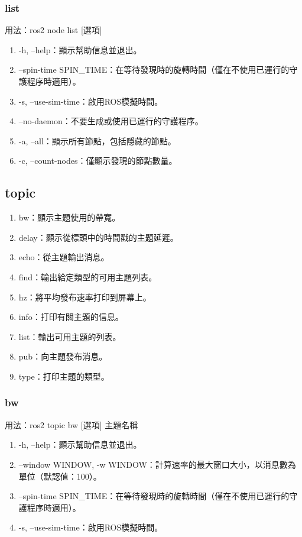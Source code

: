 \subsubsection{list}
用法：ros2 node list [選項]
\begin{enumerate}
    \item -h, --help：顯示幫助信息並退出。
    \item --spin-time SPIN\_TIME：在等待發現時的旋轉時間（僅在不使用已運行的守護程序時適用）。
    \item -s, --use-sim-time：啟用ROS模擬時間。
    \item --no-daemon：不要生成或使用已運行的守護程序。
    \item -a, --all：顯示所有節點，包括隱藏的節點。
    \item -c, --count-nodes：僅顯示發現的節點數量。
\end{enumerate}

\subsection{topic}
\begin{enumerate}
    \item bw：顯示主題使用的帶寬。
    \item delay：顯示從標頭中的時間戳的主題延遲。
    \item echo：從主題輸出消息。
    \item find：輸出給定類型的可用主題列表。
    \item hz：將平均發布速率打印到屏幕上。
    \item info：打印有關主題的信息。
    \item list：輸出可用主題的列表。
    \item pub：向主題發布消息。
    \item type：打印主題的類型。
\end{enumerate}
\subsubsection{bw}
用法：ros2 topic bw [選項] 主題名稱
\begin{enumerate}
    \item -h, --help：顯示幫助信息並退出。
    \item --window WINDOW, -w WINDOW：計算速率的最大窗口大小，以消息數為單位（默認值：100）。
    \item --spin-time SPIN\_TIME：在等待發現時的旋轉時間（僅在不使用已運行的守護程序時適用）。
    \item -s, --use-sim-time：啟用ROS模擬時間。
\end{enumerate}
